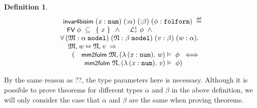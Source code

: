 \documentclass{llncs}
\newtheorem{defn}{Definition}[chapter]
\newenvironment{holmath}{\begin{displaymath}\begin{array}{l}}{\end{array}\end{displaymath}\ignorespacesafterend}
\renewcommand{\HOLConst}[1]{{\textsf{\upshape\small #1}}}
\begin{document}
\begin{defn}
{\upshape\cite[Definition 2.67 (Invariant for Bisimulations)]{Blackburn}}
\begin{holmath}
  \HOLConst{invar4bisim}\;(\HOLFreeVar{x} :\HOLTyOp{num})\;({:}\ensuremath{\alpha})\;({:}\ensuremath{\beta})\;(\HOLFreeVar{\ensuremath{\phi}} :\HOLTyOp{folform})\;\HOLTokenDefEquality{}\\
\;\;\HOLConst{FV}\;\HOLFreeVar{\ensuremath{\phi}}\;\HOLSymConst{\HOLTokenSubset{}}\;\HOLTokenLeftbrace{}\HOLFreeVar{x}\HOLTokenRightbrace{}\;\HOLSymConst{\HOLTokenConj{}}\;\HOLConst{\ensuremath{{\mathcal L}^1_\tau}}\;\HOLFreeVar{\ensuremath{\phi}}\;\HOLSymConst{\HOLTokenConj{}}\\
\;\;\HOLSymConst{\HOLTokenForall{}}(\HOLBoundVar{\ensuremath{\mathfrak{M}}} :\ensuremath{\alpha}\;\HOLTyOp{model})\;(\HOLBoundVar{\ensuremath{\mathfrak{N}}} :\ensuremath{\beta}\;\HOLTyOp{model})\;(\HOLBoundVar{v} :\ensuremath{\beta})\;(\HOLBoundVar{w} :\ensuremath{\alpha}).\\
\;\;\;\;\;\;\HOLBoundVar{\ensuremath{\mathfrak{M}}}\HOLSymConst{,}\HOLBoundVar{w}\HOLSymConst{\ensuremath{\leftrightarroweq}}\HOLBoundVar{\ensuremath{\mathfrak{N}}}\HOLSymConst{,}\HOLBoundVar{v}\;\HOLSymConst{\HOLTokenImp{}}\\
\;\;\;\;\;\;\;\;(\HOLConst{mm2folm}\;\HOLBoundVar{\ensuremath{\mathfrak{M}}},(\HOLTokenLambda{}(\HOLBoundVar{x} :\HOLTyOp{num}).\;\HOLBoundVar{w})\ensuremath{\vDash}\;\HOLFreeVar{\ensuremath{\phi}}\;\HOLSymConst{\HOLTokenEquiv{}}\\
\;\;\;\;\;\;\;\;\;\;\;\HOLConst{mm2folm}\;\HOLBoundVar{\ensuremath{\mathfrak{N}}},(\HOLTokenLambda{}(\HOLBoundVar{x} :\HOLTyOp{num}).\;\HOLBoundVar{v})\ensuremath{\vDash}\;\HOLFreeVar{\ensuremath{\phi}})
\end{holmath}
\end{defn}

By the same reason as ??, the type parameters here is necessasy. Although it is possible to prove theorems for different types $\alpha$ and $\beta$ in the above definition, we will only consider the case that $\alpha$ and $\beta$ are the same when proving theorems. 
\end{document}
